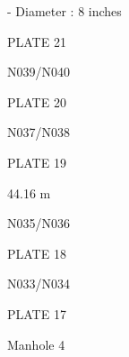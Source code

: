 \documentclass[a4paper,portrait,12pt]{article}
\begin{document}
\begin{flushleft}
- Diameter : 8 inches
\end{flushleft}





\begin{flushleft}
PLATE 21
\end{flushleft}





\begin{flushleft}
N039/N040
\end{flushleft}





\begin{flushleft}
PLATE 20
\end{flushleft}





\begin{flushleft}
N037/N038
\end{flushleft}





\begin{flushleft}
PLATE 19
\end{flushleft}


\begin{flushleft}
44.16 m
\end{flushleft}


\begin{flushleft}
N035/N036
\end{flushleft}





\begin{flushleft}
PLATE 18
\end{flushleft}





\begin{flushleft}
N033/N034
\end{flushleft}





\begin{flushleft}
PLATE 17
\end{flushleft}


\begin{flushleft}
Manhole 4
\end{flushleft}
\end{document}
